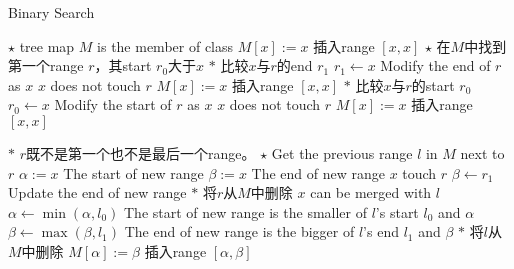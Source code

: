 \begin{algorithm}[H]
\caption{Binary Search}
\begin{algorithmic}[1]
\State $\star$ tree map $M$ is the member of class
\State $M[x]:=x$ \Comment 插入range $ [x,x] $
\State \Return
\EndIf
\State $\star$ 在$M$中找到第一个range $r$，其start $r_0$大于$ x $
\State $\ast$ 比较$x$与$ r $的end $r_1$
\State $r_1\gets x$ \Comment Modify the end of $r$ as $x$
 \Comment $x$ does not touch $r$
\State $M[x]:=x$ \Comment 插入range $ [x,x] $
\EndIf
\State \Return
\EndIf
{}
\State $\ast$ 比较$x$与$ r $的start $r_0$
\State $r_0\gets x$ \Comment Modify the start of $r$ as $x$
\Else \Comment $x$ does not touch $r$
\State $M[x]:=x$ \Comment 插入range $ [x,x] $
\EndIf
{}
\end{algorithmic}
\end{algorithm}
\begin{algorithm}[H]
\begin{algorithmic}[1]
\State \Return
\EndIf
\State $\ast$ $r$既不是第一个也不是最后一个range。
\State $\star$ Get the previous range $l$ in $M$ next to $r$
\State $\alpha:=x$ \Comment The start of new range
\State $\beta:=x$ \Comment The end of new range
 \Comment $x$ touch $r$
\State $\beta \gets r_1$ \Comment Update the end of new range
\State $\ast$ 将$r$从$M$中删除
\EndIf
{} \Comment $x$ can be merged with $l$
\State $\alpha\gets \min(\alpha, l_0)$ \Comment The start of new range is the smaller of $l$'s start $l_0$ and $\alpha$
\State $\beta\gets \max(\beta, l_1)$ \Comment The end of new range is the bigger of $l$'s end $l_1$ and $\beta$
\State $\ast$ 将$l$从$M$中删除
\EndIf
\State $M[\alpha]:=\beta$ \Comment 插入range $ [\alpha,\beta] $
\EndProcedure
\end{algorithmic}
\end{algorithm}

